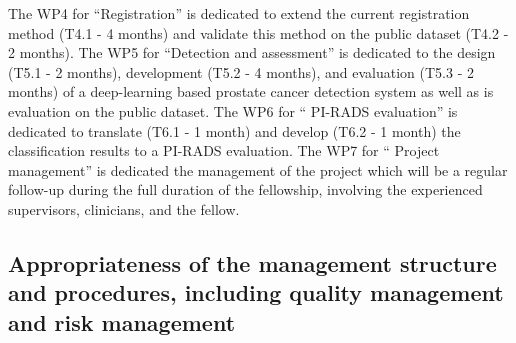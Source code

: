 The WP4 for ``Registration'' is dedicated to extend the current registration method (T4.1 - 4 months) and validate this method on the public dataset (T4.2 - 2 months).
The WP5 for ``Detection and assessment'' is dedicated to the design (T5.1 - 2 months), development (T5.2 - 4 months), and evaluation (T5.3 - 2 months) of a deep-learning based prostate cancer detection system as well as is evaluation on the public dataset.
The WP6 for `` PI-RADS evaluation'' is dedicated to translate (T6.1 - 1 month) and develop (T6.2 - 1 month) the classification results to a PI-RADS evaluation.
The WP7 for `` Project management'' is dedicated the management of the project which will be a regular follow-up during the full duration of the fellowship, involving the experienced supervisors, clinicians, and the fellow.

\subsection{Appropriateness of the management structure and procedures, including quality management and risk management}



